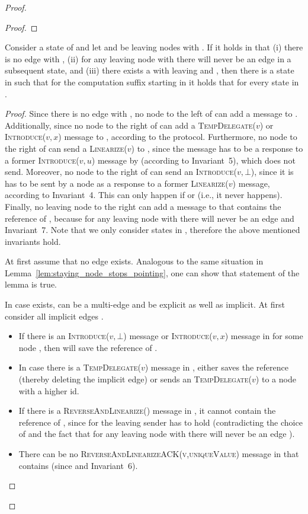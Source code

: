 \documentclass[a4paper,USenglish]{lipics}
\newcommand{\linearize}[1]{\textsc{Linearize(\ensuremath{#1})}\xspace}
\newcommand{\introduce}[1]{\textsc{Introduce(\ensuremath{#1})}\xspace}
\newcommand{\tempdelegate}[1]{\textsc{TempDelegate(\ensuremath{#1})}\xspace}
\newcommand{\revandlin}[1]{\textsc{ReverseAndLinearize(\ensuremath{#1})}\xspace} \newcommand{\revandlinREQ}[1]{\textsc{ReverseAndLinearizeREQ(#1)}\xspace}
\newcommand{\revandlinACK}[1]{\textsc{ReverseAndLinearizeACK(#1)}\xspace}
\begin{document}
\begin{proof}
\begin{proof}
\end{proof}

\begin{lemma}
\label{lem:leaving_node_stops_pointing}
Consider a state  of  and let  and  be leaving nodes with .
If it holds in  that (i) there is no edge  with , (ii) for any leaving node  with  there will never be an edge  in a subsequent state, and (iii) there exists a  with  leaving and ,
then there is a state  in  such that for the computation suffix  starting in  it holds that  for every state in .
\end{lemma}

\begin{proof}
Since there is no edge  with , no node to the left of  can add a message to .
Additionally, since  no node  to the right of  can add a \tempdelegate{v} or \introduce{v,x} message to , according to the protocol.
Furthermore, no node to the right of  can send a \linearize{v} to , since the message has to be a response to a former \introduce{v,u} message by  (according to Invariant~5), which  does not send.
Moreover, no node to the right of  can send an \introduce{v,\bot}, since it is has to be sent by a node  as a response to a former \linearize{v} message, according to Invariant~4.
This can only happen if  or  (i.e., it never happens).
Finally, no leaving node to the right can add a message to  that contains the reference of , because for any leaving node  with  there will never be an edge  and Invariant~7.
Note that we only consider states in , therefore the above mentioned invariants hold.

At first assume that no edge  exists.
Analogous to the same situation in Lemma~\ref{lem:staying_node_stops_pointing}, one can show that statement of the lemma is true.

In case  exists,  can be a multi-edge and be explicit as well as implicit. 
At first consider all implicit edges .
\begin{itemize}
\item If there is an \introduce{v,\bot} message or \introduce{v,x} message in  for some node , then  will save the reference of .
\item In case there is a \tempdelegate{v} message in ,  either saves the reference (thereby deleting the implicit edge) or sends an \tempdelegate{v} to a node with a higher id.
\item If there is a \revandlin{} message in , it cannot contain the reference of , since for the leaving sender  has to hold (contradicting the choice of  and the fact that for any leaving node  with  there will never be an edge ).
\item There can be no \revandlinACK{v,uniqueValue} message in  that contains  (since  and Invariant~6).
\end{itemize}


\end{proof}
\end{proof}
\end{document}
